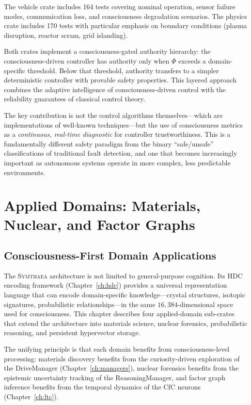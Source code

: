 \documentclass[12pt]{book}
\newcommand{\symthaea}{\textsc{Symthaea}}
\newcommand{\dimHDC}{16{,}384}
\begin{document}
The vehicle crate includes 164 tests covering nominal operation, sensor failure modes, communication loss, and consciousness degradation scenarios. The physics crate includes 170 tests with particular emphasis on boundary conditions (plasma disruption, reactor scram, grid islanding).

Both crates implement a consciousness-gated authority hierarchy: the consciousness-driven controller has authority only when $\Phi$ exceeds a domain-specific threshold. Below that threshold, authority transfers to a simpler deterministic controller with provable safety properties. This layered approach combines the adaptive intelligence of consciousness-driven control with the reliability guarantees of classical control theory.

The key contribution is not the control algorithms themselves---which are implementations of well-known techniques---but the use of consciousness metrics as a \textit{continuous, real-time diagnostic} for controller trustworthiness. This is a fundamentally different safety paradigm from the binary ``safe/unsafe'' classifications of traditional fault detection, and one that becomes increasingly important as autonomous systems operate in more complex, less predictable environments.


\chapter{Applied Domains: Materials, Nuclear, and Factor Graphs}
\label{ch:applied-domains}

\section{Consciousness-First Domain Applications}

The \symthaea{} architecture is not limited to general-purpose cognition. Its HDC encoding framework (Chapter~\ref{ch:hdc}) provides a universal representation language that can encode domain-specific knowledge---crystal structures, isotopic signatures, probabilistic relationships---in the same $\dimHDC$-dimensional space used for consciousness. This chapter describes four applied-domain sub-crates that extend the architecture into materials science, nuclear forensics, probabilistic reasoning, and persistent hypervector storage.

The unifying principle is that each domain benefits from consciousness-level processing: materials discovery benefits from the curiosity-driven exploration of the DriveManager (Chapter~\ref{ch:managers}), nuclear forensics benefits from the epistemic uncertainty tracking of the ReasoningManager, and factor graph inference benefits from the temporal dynamics of the CfC neurons (Chapter~\ref{ch:ltc}).
\end{document}
